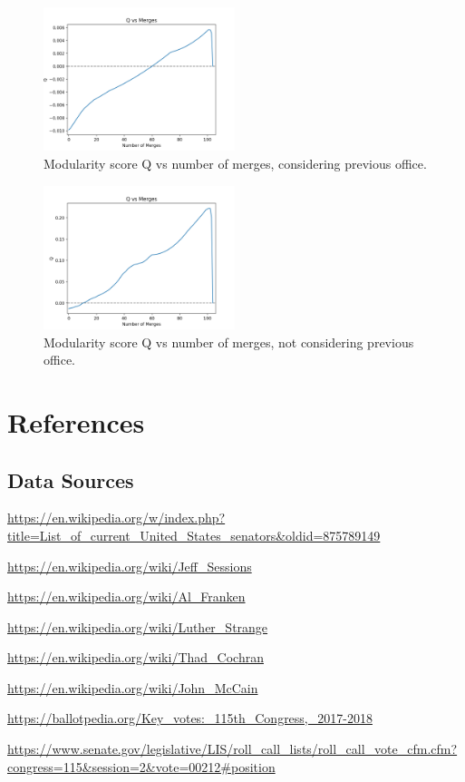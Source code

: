 \documentclass[11pt,twocolumn]{article}
\begin{document}
\begin{figure}[H]
    \centering
    \includegraphics[width=2.2in]{qvm_w_office}
    \caption{Modularity score Q vs number of merges, considering previous office.}
    \label{fig:ds}
\end{figure}
\begin{figure}[H]
    \centering
    \includegraphics[width=2.2in]{qvm_no_office}
    \caption{Modularity score Q vs number of merges, not considering previous office.}
    \label{fig:ds}
\end{figure}
	\section{References}
	\subsection{Data Sources}
	\url{https://en.wikipedia.org/w/index.php?title=List_of_current_United_States_senators&oldid=875789149}
	
	\url{https://en.wikipedia.org/wiki/Jeff_Sessions}
	
	\url{https://en.wikipedia.org/wiki/Al_Franken}
	
	\url{https://en.wikipedia.org/wiki/Luther_Strange}
	
	\url{https://en.wikipedia.org/wiki/Thad_Cochran}
	
	\url{https://en.wikipedia.org/wiki/John_McCain}
	
	\url{https://ballotpedia.org/Key_votes:_115th_Congress,_2017-2018}
	
	\url{https://www.senate.gov/legislative/LIS/roll_call_lists/roll_call_vote_cfm.cfm?congress=115&session=2&vote=00212#position}
	
\end{document}

